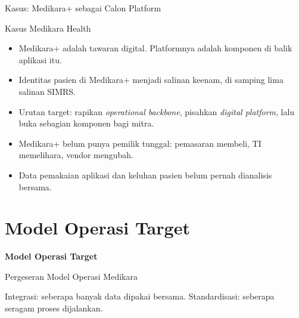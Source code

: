 \documentclass[aspectratio=169, table, 12pt]{beamer}
\begin{document}
\begin{frame}{{\Large Kasus: Medikara+ sebagai Calon Platform}}
  \begin{block}{Kasus Medikara Health}
    \small
    \begin{itemize}
      \item Medikara+ adalah tawaran digital. Platformnya adalah komponen di balik aplikasi itu.
      \item Identitas pasien di Medikara+ menjadi salinan keenam, di samping lima salinan SIMRS.
      \item Urutan target: rapikan \textit{operational backbone}, pisahkan \textit{digital platform},
            lalu buka sebagian komponen bagi mitra.
      \item Medikara+ belum punya pemilik tunggal: pemasaran membeli, TI memelihara, vendor mengubah.
      \item Data pemakaian aplikasi dan keluhan pasien belum pernah dianalisis bersama.
    \end{itemize}
  \end{block}
\end{frame}

\section{Model Operasi Target}

\begin{frame}{\hfill}
  \centering
  \Huge{\textbf{Model Operasi Target}}
\end{frame}

\begin{frame}{{\Large Pergeseran Model Operasi Medikara}}
  \centering
  {\small Integrasi: seberapa banyak data dipakai bersama. Standardisasi: seberapa seragam proses
  dijalankan.\par}
  \vspace{4pt}
\end{frame}
\end{document}
